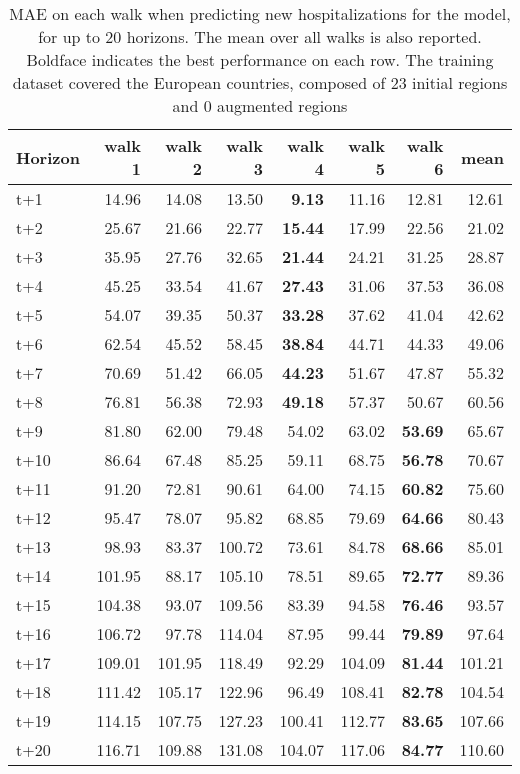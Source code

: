 \begin{table}[H]
\centering
\caption{MAE on each walk when predicting new hospitalizations for the model, for up to 20 horizons. The mean over all walks is also reported. Boldface indicates the best performance on each row. The training dataset covered the European countries, composed of 23 initial regions and 0 augmented regions }
\label{tab:MAE_walk_baseline}
\begin{tabular}{lrrrrrrr}
\toprule
Horizon &  walk 1 &  walk 2 &  walk 3 &  walk 4 &  walk 5 &  walk 6 &   mean \\
\midrule
t+1  & 14.96  & 14.08  & 13.50  & \textbf{9.13}  & 11.16  & 12.81  & 12.61  \\
t+2  & 25.67  & 21.66  & 22.77  & \textbf{15.44}  & 17.99  & 22.56  & 21.02  \\
t+3  & 35.95  & 27.76  & 32.65  & \textbf{21.44}  & 24.21  & 31.25  & 28.87  \\
t+4  & 45.25  & 33.54  & 41.67  & \textbf{27.43}  & 31.06  & 37.53  & 36.08  \\
t+5  & 54.07  & 39.35  & 50.37  & \textbf{33.28}  & 37.62  & 41.04  & 42.62  \\
t+6  & 62.54  & 45.52  & 58.45  & \textbf{38.84}  & 44.71  & 44.33  & 49.06  \\
t+7  & 70.69  & 51.42  & 66.05  & \textbf{44.23}  & 51.67  & 47.87  & 55.32  \\
t+8  & 76.81  & 56.38  & 72.93  & \textbf{49.18}  & 57.37  & 50.67  & 60.56  \\
t+9  & 81.80  & 62.00  & 79.48  & 54.02  & 63.02  & \textbf{53.69}  & 65.67  \\
t+10  & 86.64  & 67.48  & 85.25  & 59.11  & 68.75  & \textbf{56.78}  & 70.67  \\
t+11  & 91.20  & 72.81  & 90.61  & 64.00  & 74.15  & \textbf{60.82}  & 75.60  \\
t+12  & 95.47  & 78.07  & 95.82  & 68.85  & 79.69  & \textbf{64.66}  & 80.43  \\
t+13  & 98.93  & 83.37  & 100.72  & 73.61  & 84.78  & \textbf{68.66}  & 85.01  \\
t+14  & 101.95  & 88.17  & 105.10  & 78.51  & 89.65  & \textbf{72.77}  & 89.36  \\
t+15  & 104.38  & 93.07  & 109.56  & 83.39  & 94.58  & \textbf{76.46}  & 93.57  \\
t+16  & 106.72  & 97.78  & 114.04  & 87.95  & 99.44  & \textbf{79.89}  & 97.64  \\
t+17  & 109.01  & 101.95  & 118.49  & 92.29  & 104.09  & \textbf{81.44}  & 101.21  \\
t+18  & 111.42  & 105.17  & 122.96  & 96.49  & 108.41  & \textbf{82.78}  & 104.54  \\
t+19  & 114.15  & 107.75  & 127.23  & 100.41  & 112.77  & \textbf{83.65}  & 107.66  \\
t+20  & 116.71  & 109.88  & 131.08  & 104.07  & 117.06  & \textbf{84.77}  & 110.60  \\

\bottomrule
\end{tabular}
\end{table}
